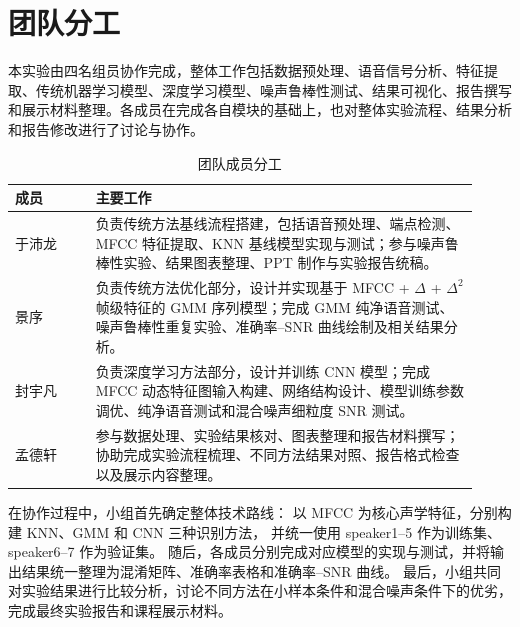 \section{团队分工}

本实验由四名组员协作完成，整体工作包括数据预处理、语音信号分析、特征提取、传统机器学习模型、深度学习模型、噪声鲁棒性测试、结果可视化、报告撰写和展示材料整理。各成员在完成各自模块的基础上，也对整体实验流程、结果分析和报告修改进行了讨论与协作。

\begin{table}[H]
  \centering
  \caption{团队成员分工}
  \label{tab:team-contribution}
  \small
  \begin{tabular}{p{0.16\linewidth}p{0.76\linewidth}}
    \toprule
    成员 & 主要工作 \\
    \midrule
    于沛龙 &
    负责传统方法基线流程搭建，包括语音预处理、端点检测、MFCC 特征提取、KNN 基线模型实现与测试；参与噪声鲁棒性实验、结果图表整理、PPT 制作与实验报告统稿。 \\
    \addlinespace

    景序 &
    负责传统方法优化部分，设计并实现基于 MFCC + $\Delta$ + $\Delta^2$ 帧级特征的 GMM 序列模型；完成 GMM 纯净语音测试、噪声鲁棒性重复实验、准确率--SNR 曲线绘制及相关结果分析。 \\
    \addlinespace

    封宇凡 &
    负责深度学习方法部分，设计并训练 CNN 模型；完成 MFCC 动态特征图输入构建、网络结构设计、模型训练参数调优、纯净语音测试和混合噪声细粒度 SNR 测试。 \\
    \addlinespace

    孟德轩 &
    参与数据处理、实验结果核对、图表整理和报告材料撰写；协助完成实验流程梳理、不同方法结果对照、报告格式检查以及展示内容整理。 \\
    \bottomrule
  \end{tabular}
\end{table}

在协作过程中，小组首先确定整体技术路线：
以 MFCC 为核心声学特征，分别构建 KNN、GMM 和 CNN 三种识别方法，
并统一使用 speaker1--5 作为训练集、speaker6--7 作为验证集。
随后，各成员分别完成对应模型的实现与测试，并将输出结果统一整理为混淆矩阵、准确率表格和准确率--SNR 曲线。
最后，小组共同对实验结果进行比较分析，讨论不同方法在小样本条件和混合噪声条件下的优劣，完成最终实验报告和课程展示材料。
